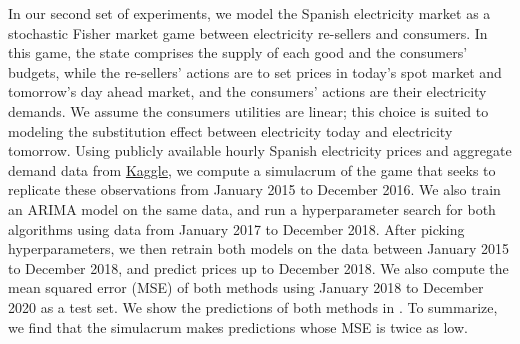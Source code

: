 In our second set of experiments, we model the Spanish electricity market as a stochastic Fisher market game between electricity re-sellers
and consumers.
In this game, the state comprises the supply of each good and the consumers' budgets, while the re-sellers' actions are to set prices in today's spot market and tomorrow's day ahead market, and the consumers' actions are their electricity demands.
We assume the consumers utilities are linear; this choice is suited to modeling the substitution effect between electricity today and electricity tomorrow.
Using publicly available hourly Spanish electricity prices and aggregate demand data from \href{https://www.kaggle.com/datasets/nicholasjhana/energy-consumption-generation-prices-and-weather}{Kaggle}, we compute a simulacrum of the game that seeks to replicate these observations
from January 2015 to December 2016. 
We also train an ARIMA model on the same data, and run a hyperparameter search for both algorithms using data from January 2017 to December 2018. 
After picking hyperparameters, we then retrain both models on the data between January 2015 to December 2018, and predict prices up to December 2018. 
We also compute the mean squared error (MSE) of both methods using January 2018 to December 2020 as a test set.
We show the predictions of both methods in . 
To summarize, we find that the simulacrum makes predictions whose MSE is twice as low.

